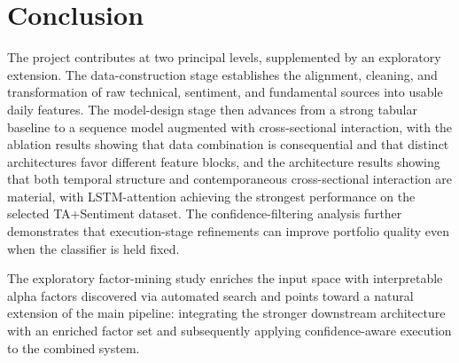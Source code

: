 \documentclass[12pt]{article}
\begin{document}
\section{Conclusion}

The project contributes at two principal levels, supplemented by an exploratory extension. The data-construction stage establishes the alignment, cleaning, and transformation of raw technical, sentiment, and fundamental sources into usable daily features. The model-design stage then advances from a strong tabular baseline to a sequence model augmented with cross-sectional interaction, with the ablation results showing that data combination is consequential and that distinct architectures favor different feature blocks, and the architecture results showing that both temporal structure and contemporaneous cross-sectional interaction are material, with LSTM-attention achieving the strongest performance on the selected TA+Sentiment dataset. The confidence-filtering analysis further demonstrates that execution-stage refinements can improve portfolio quality even when the classifier is held fixed.

The exploratory factor-mining study enriches the input space with interpretable alpha factors discovered via automated search and points toward a natural extension of the main pipeline: integrating the stronger downstream architecture with an enriched factor set and subsequently applying confidence-aware execution to the combined system.
\end{document}
